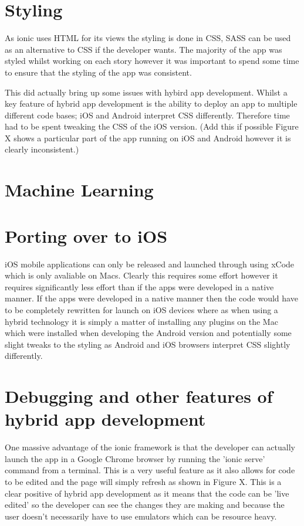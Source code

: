 \section{Styling}
As ionic uses HTML for its views the styling is done in CSS, SASS can be used as an alternative to CSS if the developer wants. The majority of the app was styled whilst working on each story however it was important to spend some time to ensure that the styling of the app was consistent.

This did actually bring up some issues with hybird app development. Whilst a key feature of hybrid app development is the ability to deploy an app to multiple different code bases; iOS and Android interpret CSS differently. Therefore time had to be spent tweaking the CSS of the iOS version. (Add this if possible Figure X shows a particular part of the app running on iOS and Android however it is clearly inconsistent.)

\section{Machine Learning}

\section{Porting over to iOS}
iOS mobile applications can only be released and launched through using xCode which is only avaliable on Macs. Clearly this requires some effort however it requires significantly less effort than if the apps were developed in a native manner. If the apps were developed in a native manner then the code would have to be completely rewritten for launch on iOS devices where as when using a hybrid technology it is simply a matter of installing any plugins on the Mac which were installed when developing the Android version and potentially some slight tweaks to the styling as Android and iOS browsers interpret CSS slightly differently. 

\section{Debugging and other features of hybrid app development}
One massive advantage of the ionic framework is that the developer can actually launch the app in a Google Chrome browser by running the 'ionic serve' command from a terminal. This is a very useful feature as it also allows for code to be edited and the page will simply refresh as shown in Figure X. This is a clear positive of hybrid app development as it means that the code can be 'live edited' so the developer can see the changes they are making and because the user doesn't necessarily have to use emulators which can be resource heavy.

